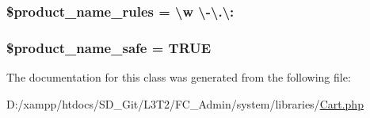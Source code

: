 \subsubsection[{\$product\+\_\+name\+\_\+rules}]{\setlength{\rightskip}{0pt plus 5cm}\$product\+\_\+name\+\_\+rules = \textquotesingle{}\textbackslash{}w \textbackslash{}-\/\textbackslash{}.\textbackslash{}\+:\textquotesingle{}}\label{class_c_i___cart_afdc2e791be5e676e94580a0d9ed63ebf}
\hypertarget{class_c_i___cart_afefced563284b97869b3d35053857362}{}
\subsubsection[{\$product\+\_\+name\+\_\+safe}]{\setlength{\rightskip}{0pt plus 5cm}\$product\+\_\+name\+\_\+safe = T\+R\+U\+E}\label{class_c_i___cart_afefced563284b97869b3d35053857362}


The documentation for this class was generated from the following file\+:\begin{DoxyCompactItemize}
\item 
D\+:/xampp/htdocs/\+S\+D\+\_\+\+Git/\+L3\+T2/\+F\+C\+\_\+\+Admin/system/libraries/\hyperlink{_cart_8php}{Cart.\+php}\end{DoxyCompactItemize}
